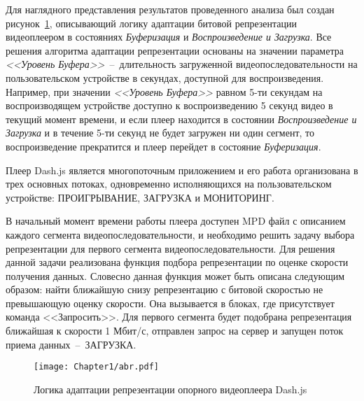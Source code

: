 Для наглядного представления результатов проведенного анализа был создан рисунок~\ref{fig:abr}, описывающий логику адаптации битовой репрезентации видеоплеером в состояниях \textit{Буферизация} и \textit{Воспроизведение и Загрузка}. Все решения алгоритма адаптации репрезентации основаны на значении параметра \textit{<<Уровень Буфера>>}~--~длительность загруженной видеопоследовательности на пользовательском устройстве в секундах, доступной для воспроизведения. Например, при значении \textit{<<Уровень Буфера>>} равном 5-ти секундам на воспроизводящем устройстве доступно к воспроизведению 5 секунд видео в текущий момент времени, и если плеер находится в состоянии \textit{Воспроизведение и Загрузка} и в течение 5-ти секунд не будет загружен ни один сегмент, то воспроизведение прекратится и плеер перейдет в состояние \textit{Буферизация}.

Плеер Dash.js является многопоточным приложением и его работа организована в трех основных потоках, одновременно исполняющихся на пользовательском устройстве: ПРОИГРЫВАНИЕ, ЗАГРУЗКА и МОНИТОРИНГ.

В начальный момент времени работы плеера доступен MPD файл с описанием каждого сегмента видеопоследовательности, и необходимо решить задачу выбора репрезентации для первого сегмента видеопоследовательности. Для решения данной задачи реализована функция подбора репрезентации по оценке скорости получения данных. Словесно данная функция может быть описана следующим образом: найти ближайшую снизу репрезентацию с битовой скоростью не превышающую оценку скорости. Она вызывается в блоках, где присутствует команда <<Запросить>>. Для первого сегмента будет подобрана репрезентация ближайшая к скорости 1 Мбит/с, отправлен запрос на сервер и запущен поток приема данных~--~ЗАГРУЗКА.

\begin{landscape}
\begin{figure}[h]
\begin{center}
\texttt{[image: Chapter1/abr.pdf]}
\caption{Логика адаптации репрезентации опорного видеоплеера Dash.js}
\label{fig:abr}
\end{center}
\end{figure}
\end{landscape}

